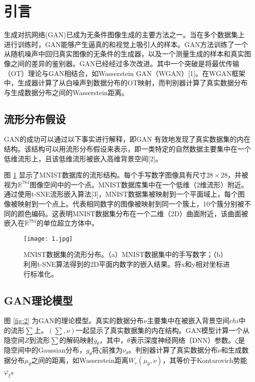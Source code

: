 
\newpage

\section{引言}

生成对抗网络(GAN)已成为无条件图像生成的主要方法之一。当在多个数据集上进行训练时，GAN能够产生逼真的和视觉上吸引人的样本。GAN方法训练了一个从随机噪声中回归真实图像的无条件的生成器，以及一个测量生成的样本和真实图像之间的差异的鉴别器。GAN已经经过多次改进。其中一个突破是将最优传输（OT）理论与GAN相结合，如Wasserstein GAN（WGAN）[1]。在WGAN框架中，生成器计算了从白噪声到数据分布的OT映射，而判别器计算了真实数据分布与生成数据分布之间的Wasserstein距离。

\subsection{流形分布假设}

GAN的成功可以通过以下事实进行解释，即GAN
有效地发现了真实数据集的内在结构。该结构可以用流形分布假设来表示，即一类特定的自然数据主要集中在一个低维流形上，且该低维流形被嵌入高维背景空间[2]。

图 \ref{fig:1} 显示了MNIST数据库的流形结构。每个手写数字图像具有尺寸$28 \times 28$，并被视为$\mathbb{R}^{784}$图像空间中的一个点。MNIST数据库集中在一个低维（2维流形）附近。通过使用t-SNE流形嵌入算法[3]，MNIST数据集被映射到一个平面域上，每个图像被映射到一个点上。代表相同数字的图像被映射到同一个簇上，10个簇分别被不同的颜色编码。这表明MNIST数据集分布在一个二维（2D）曲面附近，该曲面被嵌入在$\mathbb{R}^784$的单位超立方体中。

\begin{figure}[h]
	\centering
	\texttt{[image: 1.jpg]}
	\caption{MNIST数据集的流形分布。（a）MNIST数据集中的手写数字；（b）利用t-SNE算法得到的2D平面内数字的嵌入结果。将x和y相对坐标进行标准化。}
	\label{fig:1}
\end{figure}

\subsection{GAN理论模型}

图 \ref{fig:2} 为GAN的理论模型。真实的数据分布$\nu$主要集中在被嵌入背景空间$chi$中的流形$\sum$上。$(\sum, \nu)$一起显示了真实数据集的内在结构。GAN模型计算一个从隐空间$Z$到流形$\sum$的解码映射$g_{\theta}$，其中，$\theta$表示深度神经网络（DNN）参数。$\zeta$是隐空间中的Gaussian分布，$g_{\theta}$将$\zeta$前推为$\nu_{\theta}$。判别器计算了真实数据分布$\nu$和生成数据分布$\mu_{\theta}$之间的距离，如Wasserstein距离$W_c(\mu_{\theta},\nu)$，其等价于Kontarovich势能$\varphi_{\xi}$。

